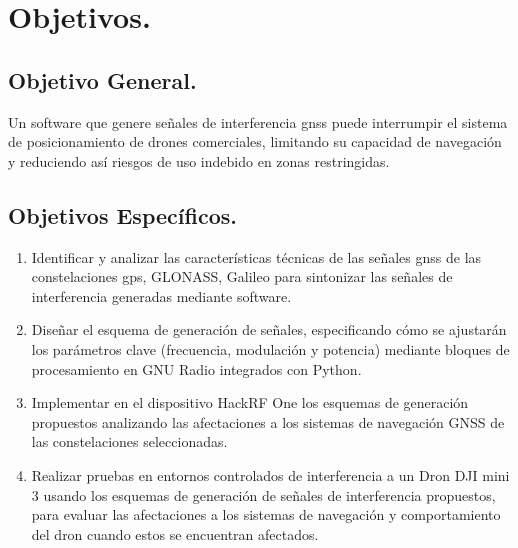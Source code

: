 \chapter*{Objetivos.}

\section*{\fontsize{12}{18}\selectfont Objetivo General.}

\begin{justify}
    Un software que genere señales de interferencia \gls{gnss} puede interrumpir
    el sistema de posicionamiento de drones comerciales,
    limitando su capacidad de navegación y reduciendo así riesgos de uso
    indebido en zonas restringidas.
\end{justify}

\section*{\fontsize{12}{18}\selectfont Objetivos Específicos.}

\begin{justify}
    \begin{enumerate}
        \item Identificar y analizar las características técnicas de las señales
        \gls{gnss} de las constelaciones \gls{gps}, GLONASS, Galileo para sintonizar
        las señales de interferencia generadas mediante software.\\

        \item Diseñar el esquema de generación de señales, especificando 
        cómo se ajustarán los parámetros clave
        (frecuencia, modulación y potencia) mediante bloques de procesamiento
        en GNU Radio integrados con Python.\\

        \item Implementar en el dispositivo HackRF One los esquemas de
        generación propuestos analizando las afectaciones a los sistemas de
        navegación GNSS de las constelaciones seleccionadas.\\

        \item Realizar pruebas en entornos controlados de interferencia a un
        Dron DJI mini 3 usando los esquemas de generación de señales de
        interferencia propuestos, para evaluar las afectaciones a los sistemas
        de navegación y comportamiento del dron cuando estos se encuentran afectados.
    \end{enumerate}
\end{justify}